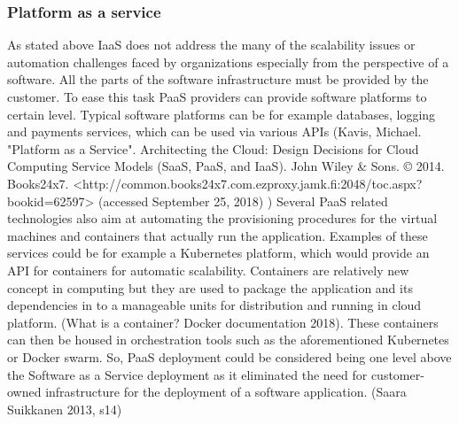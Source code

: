 \documentclass{article}
\begin{document}
\subsubsection{Platform as a service}
As stated above IaaS does not address the many of the scalability issues or automation challenges faced by organizations especially from the perspective of a software. All the parts of the software infrastructure must be provided by the customer. To ease this task PaaS providers can provide software platforms to certain level. Typical software platforms can be for example databases, logging and payments services, which can be used via various APIs (Kavis, Michael. "Platform as a Service". Architecting the Cloud: Design Decisions for Cloud Computing Service Models (SaaS, PaaS, and IaaS). John Wiley \& Sons. © 2014. Books24x7. <http://common.books24x7.com.ezproxy.jamk.fi:2048/toc.aspx?bookid=62597> (accessed September 25, 2018) )
Several PaaS related technologies also aim at automating the provisioning procedures for the virtual machines and containers that actually run the application. Examples of these services could be for example a Kubernetes platform, which would provide an API for containers for automatic scalability. Containers are relatively new concept in computing but they are used to package the application and its dependencies in to a manageable units for distribution and running in cloud platform. (What is a container? Docker documentation 2018). These containers can then be housed in orchestration tools such as the aforementioned Kubernetes or Docker swarm.
So, PaaS deployment could be considered being one level above the Software as a Service deployment as it eliminated the need for customer-owned infrastructure for the deployment of a software application. (Saara Suikkanen 2013, s14)
\end{document}
